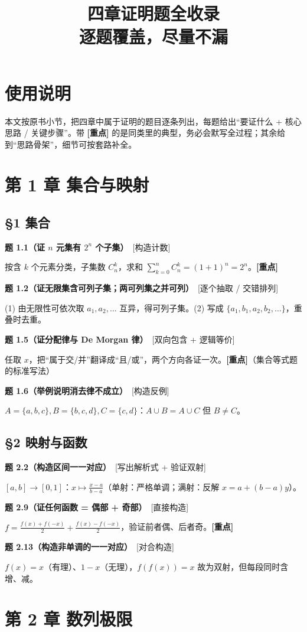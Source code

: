 \documentclass[11pt,a4paper,UTF8]{ctexart}
\title{四章证明题全收录\\[4pt]\large 逐题覆盖，尽量不漏}
\author{}
\date{}
\newcommand{\p}[2]{\par\smallskip\noindent\textbf{#1}\ \textcolor{blue!55!black}{[#2]}\par\nopagebreak}
\begin{document}
\maketitle
\tableofcontents\newpage

\section*{使用说明}
本文按原书小节，把四章中属于证明的题目逐条列出，每题给出“要证什么 + 核心思路 / 关键步骤”。带 \textbf{[重点]} 的是同类里的典型，务必会默写全过程；其余给到“思路骨架”，细节可按套路补全。

\section{第 1 章 集合与映射}

\subsection*{§1 集合}
\p{题 1.1（证 $n$ 元集有 $2^n$ 个子集）}{构造计数}
按含 $k$ 个元素分类，子集数 $C_n^k$，求和 $\sum_{k=0}^n C_n^k=(1+1)^n=2^n$。\textbf{[重点]}

\p{题 1.2（证无限集含可列子集；两可列集之并可列）}{逐个抽取 / 交错排列}
(1) 由无限性可依次取 $a_1,a_2,\dots$ 互异，得可列子集。(2) 写成 $\{a_1,b_1,a_2,b_2,\dots\}$，重叠时去重。

\p{题 1.5（证分配律与 De Morgan 律）}{双向包含 + 逻辑等价}
任取 $x$，把“属于交/并”翻译成“且/或”，两个方向各证一次。\textbf{[重点]}（集合等式题的标准写法）

\p{题 1.6（举例说明消去律不成立）}{构造反例}
$A=\{a,b,c\},B=\{b,c,d\},C=\{c,d\}$：$A\cup B=A\cup C$ 但 $B\ne C$。

\subsection*{§2 映射与函数}
\p{题 2.2（构造区间一一对应）}{写出解析式 + 验证双射}
$[a,b]\to[0,1]$：$x\mapsto\frac{x-a}{b-a}$（单射：严格单调；满射：反解 $x=a+(b-a)y$）。

\p{题 2.9（证任何函数 = 偶部 + 奇部）}{直接构造}
$f=\frac{f(x)+f(-x)}2+\frac{f(x)-f(-x)}2$，验证前者偶、后者奇。\textbf{[重点]}

\p{题 2.13（构造非单调的一一对应）}{对合构造}
$f(x)=x$（有理）、$1-x$（无理），$f(f(x))=x$ 故为双射，但每段同时含增、减。

\section{第 2 章 数列极限}
\end{document}

